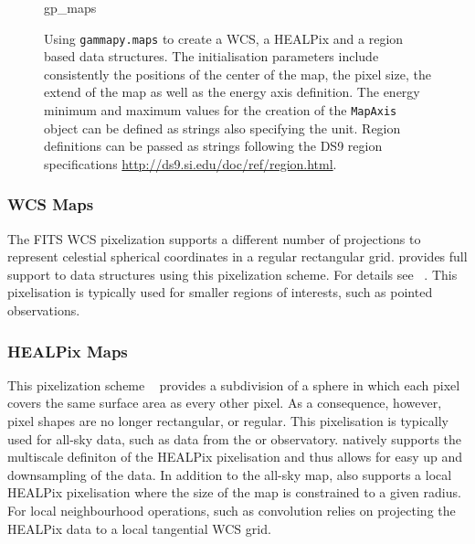 \documentclass[traditabstract, longauth]{aa}
\newcommand{\code}[1]{\texttt{#1}}
\begin{document}
{\begin{figure}
	{gp_maps}

	\caption{
        Using \code{gammapy.maps} to create a WCS, a HEALPix and a region
		based data structures. The initialisation parameters include
        consistently the positions of the center of the map, the pixel
        size, the extend of the map as well as the energy axis definition.
        The energy minimum and maximum values for the creation of the
        \code{MapAxis} object can be defined as strings also specifying the
        unit. Region definitions can be passed as strings following
        the DS9 region specifications \url{http://ds9.si.edu/doc/ref/region.html}.
        }
    \label{ig*:minted:gp_maps}
\end{figure}

\subsubsection{WCS Maps}
The FITS WCS pixelization supports a different number of projections to
represent celestial spherical coordinates in a regular rectangular grid.
\gammapy provides full support to data structures using this pixelization
scheme. For details see ~\cite{Calabretta2002}. This pixelisation
is typically used for smaller regions of interests, such as pointed
observations.


\subsubsection{HEALPix Maps}
This pixelization scheme ~\citep{Calabretta2002} provides a
subdivision of a sphere in which each pixel covers the same surface area as
every other pixel. As a consequence, however, pixel shapes are no longer
rectangular, or regular.
This pixelisation is typically used for all-sky data, such as data
from the \hawc or \fermi observatory. \gammapy natively supports
the multiscale definiton of the HEALPix pixelisation and thus
allows for easy up and downsampling of the data. In addition to
the all-sky map, \gammapy also supports a local HEALPix
pixelisation where the size of the map is constrained to a given
radius.
For local neighbourhood operations, such as convolution \gammapy relies
on projecting the HEALPix data to a local tangential WCS grid.

}
\end{document}
